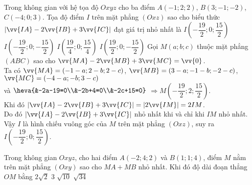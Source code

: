 \begin{ex}%
	Trong không gian với hệ tọa độ $Oxyz$ cho ba điểm $A(-1;2;2)$, $B(3;-1;-2)$, $C(-4;0;3)$. Tọa độ điểm $I$ trên mặt phẳng $(Oxz)$ sao cho biểu thức $\left|\vv{IA}-2\vv{IB}+3\vv{IC}\right|$ đạt giá trị nhỏ nhất là
	\choice
	{\True $I\left(-\dfrac{19}{2};0;\dfrac{15}{2}\right)$}
	{$I\left(-\dfrac{19}{2};0;-\dfrac{15}{2}\right)$}
	{$I\left(\dfrac{19}{4};0;\dfrac{15}{4}\right)$}
	{$I\left(\dfrac{19}{2};0;-\dfrac{15}{2}\right)$}
	\loigiai
	{Gọi $M(a;b;c)$ thuộc mặt phẳng $(ABC)$ sao cho $\vv{MA}-2\vv{MB}+3\vv{MC}=\vv{0}$.\\
		Ta có $\vv{MA}=(-1-a;2-b;2-c)$, $\vv{MB}=(3-a;-1-b;-2-c)$, $\vv{MC}=(-4-a;-b;3-c)$\\
		và $\heva{&-2a-19=0\\&-2b+4=0\\&-2c+15=0}$ $\Rightarrow M\left(-\dfrac{19}{2};2;\dfrac{15}{2}\right)$.\\
		Khi đó $\left|\vv{IA}-2\vv{IB}+3\vv{IC}\right|=\left|2\vv{IM}\right|=2IM$.\\
		Do đó $\left|\vv{IA}-2\vv{IB}+3\vv{IC}\right|$ nhỏ nhất khi và chỉ khi $IM$ nhỏ nhất. Vậy $I$ là hình chiếu vuông góc của $M$ trên mặt phẳng $(Oxz)$, suy ra $I\left(-\dfrac{19}{2};0;\dfrac{15}{2}\right)$.
	}
\end{ex}
\begin{ex}%
	Trong không gian $Oxyz$, cho hai điểm $A(-2;4;2)$ và $B(1;1;4)$, điểm $M$ nằm trên mặt phẳng $(Oxy)$ sao cho $MA+MB$ nhỏ nhất. Khi đó độ dài đoạn thẳng $OM$ bằng
	\choice
	{$2\sqrt{2}$}
	{$3$}
	{\True $\sqrt{10}$}
	{$\sqrt{34}$}
\end{ex}

